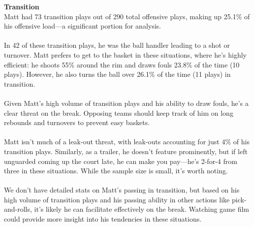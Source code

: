 \documentclass[a4paper,12pt]{article}
\begin{document}
\begin{multicols}{2}
    {\large \noindent \textbf{Transition}} \\
    Matt had 73 transition plays out of 290 total offensive plays, making up 25.1\% of his offensive load—a significant portion for analysis. \\ \\
    In 42 of these transition plays, he was the ball handler leading to a shot or turnover. Matt prefers to get to the basket in these situations, where he's highly efficient: he shoots 55\% around the rim and draws fouls 23.8\% of the time (10 plays). However, he also turns the ball over 26.1\% of the time (11 plays) in transition.\\ \\
    Given Matt's high volume of transition plays and his ability to draw fouls, he's a clear threat on the break. Opposing teams should keep track of him on long rebounds and turnovers to prevent easy baskets.\\ \\
    Matt isn't much of a leak-out threat, with leak-outs accounting for just 4\% of his transition plays. Similarly, as a trailer, he doesn't feature prominently, but if left unguarded coming up the court late, he can make you pay—he's 2-for-4 from three in these situations. While the sample size is small, it's worth noting. \\ \\
    We don't have detailed stats on Matt's passing in transition, but based on his high volume of transition plays and his passing ability in other actions like pick-and-rolls, it's likely he can facilitate effectively on the break. Watching game film could provide more insight into his tendencies in these situations. \vspace{1em} 
    

\end{multicols}
\end{document}
